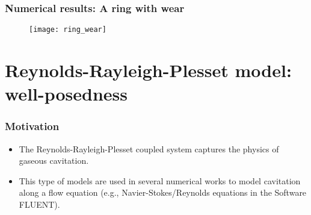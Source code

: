 \documentclass[10pt,aspectratio=169]{beamer}
\begin{document}
\begin{frame}
\frametitle{Numerical results: A ring with wear}
\vspace*{1.0cm}
\begin{figure}
	\centering
	\texttt{[image: ring\_wear]}
\end{figure}

\begin{table}
	\caption{Minimum value of $\delta$ for which the simulations fail for every $\delta\geq \delta_\tm{max}$.}\label{tab:hmax}
\end{table}
\end{frame}


\setcounter{showSlideNumbers}{0}
\section{Reynolds-Rayleigh-Plesset model: well-posedness}

\begin{frame}[noframenumbering]
\tableofcontents[
currentsection,
currentsubsection,
subsectionstyle=show/shaded/hide
]
\end{frame}
\setcounter{showSlideNumbers}{1}

\begin{frame}
\frametitle{Motivation}
\begin{itemize}
	\item The Reynolds-Rayleigh-Plesset coupled system captures the physics of gaseous cavitation.
	\item This type of models are used in several numerical works to model cavitation along a flow equation (e.g., Navier-Stokes/Reynolds equations in the Software FLUENT).

\end{itemize}
\end{frame}
\end{document}
